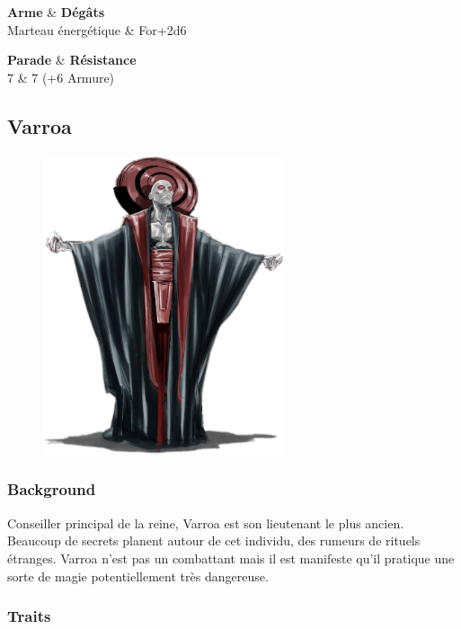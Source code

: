 \begin{itemtable}[ l X ]
    \textbf{Arme}        & \textbf{Dégâts} \\
    Marteau énergétique  & For+2d6
\end{itemtable}

\begin{itemtable}[ c c ]
    \textbf{Parade}     & \textbf{Résistance} \\
    7                   & 7 (+6 Armure)
\end{itemtable}

\newpage
\subsection{Varroa} \label{sec:varroa}
\begin{figure}[h!]
    \centering
    \includegraphics[height=250pt]{_img/pnjs/varroa.png}
\end{figure}

\subsubsection{Background}
Conseiller principal de la reine, Varroa est son lieutenant le plus ancien. Beaucoup de secrets planent autour de cet individu, des rumeurs de rituels étranges. Varroa n’est pas un combattant mais il est manifeste qu’il pratique une sorte de magie potentiellement très dangereuse.

\subsubsection{Traits}

